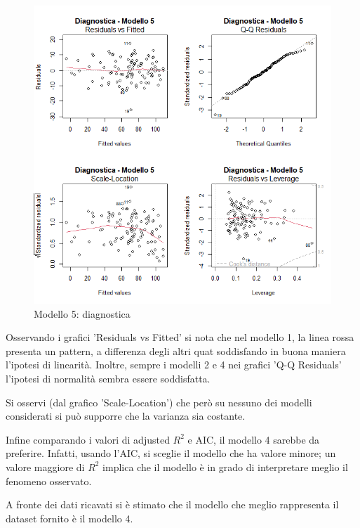 \begin{figure}[H]
	\centering
	\includegraphics[width=0.75\linewidth]{../graphs/diagnostica/modello5}
	\caption{Modello 5: diagnostica}
	\label{fig:diagnostica_modello5}
\end{figure}

Osservando i grafici 'Residuals vs Fitted' si nota che nel modello 1, la linea rossa presenta un pattern, a differenza degli altri quat soddisfando in buona maniera l'ipotesi di linearità. Inoltre, sempre i modelli 2 e 4 nei grafici 'Q-Q Residuals' l'ipotesi di normalità sembra essere soddisfatta. 

Si osservi (dal grafico 'Scale-Location') che però su nessuno dei modelli considerati si può supporre che la varianza sia costante.

Infine comparando i valori di adjusted $R^2$ e AIC, il modello 4 sarebbe da preferire. Infatti, usando l'AIC, si sceglie il modello che ha valore minore; un valore maggiore di $R^2$ implica che il modello è in grado di interpretare meglio il fenomeno osservato.

A fronte dei dati ricavati si è stimato che il modello che meglio rappresenta il dataset fornito è il modello 4.


